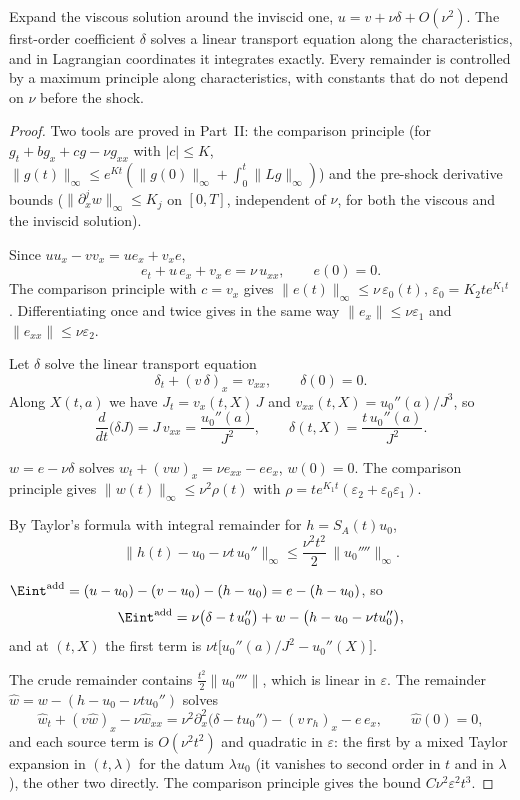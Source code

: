 \begin{proofidea}
Expand the viscous solution around the inviscid one, $u=v+\nu\delta+O(\nu^2)$. The first-order coefficient $\delta$ solves a linear transport equation along the characteristics, and in Lagrangian coordinates it integrates exactly. Every remainder is controlled by a maximum principle along characteristics, with constants that do not depend on $\nu$ before the shock.
\end{proofidea}

\begin{proof}
Two tools are proved in Part~II: the comparison principle  (for $g_t+bg_x+cg-\nu g_{xx}$ with $|c|\le K$, $\|g(t)\|_\infty\le e^{Kt}(\|g(0)\|_\infty+\int_0^t\|Lg\|_\infty)$) and the pre-shock derivative bounds  ($\|\partial_x^jw\|_\infty\le K_j$ on $[0,T]$, independent of $\nu$, for both the viscous and the inviscid solution).

Since $uu_x-vv_x=ue_x+v_xe$,
\[
e_t+u\,e_x+v_x\,e=\nu\,u_{xx},\qquad e(0)=0 .
\]
The comparison principle with $c=v_x$ gives $\|e(t)\|_\infty\le\nu\,\varepsilon_0(t)$, $\varepsilon_0=K_2te^{K_1t}$. Differentiating once and twice gives in the same way $\|e_x\|\le\nu\varepsilon_1$ and $\|e_{xx}\|\le\nu\varepsilon_2$.

Let $\delta$ solve the linear transport equation
\[
\delta_t+(v\,\delta)_x=v_{xx},\qquad \delta(0)=0 .
\]
Along $X(t,a)$ we have $J_t=v_x(t,X)\,J$ and $v_{xx}(t,X)=u_0''(a)/J^3$, so
\[
\frac{d}{dt}\big(\delta J\big)=J\,v_{xx}=\frac{u_0''(a)}{J^2},\qquad
\delta(t,X)=\frac{t\,u_0''(a)}{J^2}.
\]

$w=e-\nu\delta$ solves $w_t+(vw)_x=\nu e_{xx}-ee_x$, $w(0)=0$. The comparison principle gives $\|w(t)\|_\infty\le\nu^2\rho(t)$ with $\rho=te^{K_1t}(\varepsilon_2+\varepsilon_0\varepsilon_1)$.

By Taylor's formula with integral remainder for $h=S_A(t)u_0$,
\[
\big\|h(t)-u_0-\nu t\,u_0''\big\|_\infty\le\frac{\nu^2t^2}{2}\,\|u_0''''\|_\infty .
\]

$\Eint^{\mathrm{add}}=(u-u_0)-(v-u_0)-(h-u_0)=e-(h-u_0)$, so
\[
\Eint^{\mathrm{add}}=\nu\big(\delta-t\,u_0''\big)+w-\big(h-u_0-\nu tu_0''\big),
\]
and at $(t,X)$ the first term is $\nu t\big[u_0''(a)/J^2-u_0''(X)\big]$.

The crude remainder contains $\tfrac{t^2}2\|u_0''''\|$, which is linear in $\varepsilon$. The remainder $\hat w=w-(h-u_0-\nu tu_0'')$ solves
\[
\hat w_t+(v\hat w)_x-\nu\hat w_{xx}=\nu^2\partial_x^2\big(\delta-tu_0''\big)-(v\,r_h)_x-e\,e_x,\qquad \hat w(0)=0,
\]
and each source term is $O(\nu^2t^2)$ and quadratic in $\varepsilon$: the first by a mixed Taylor expansion in $(t,\lambda)$ for the datum $\lambda u_0$ (it vanishes to second order in $t$ and in $\lambda$), the other two directly. The comparison principle gives the bound $C\nu^2\varepsilon^2t^3$.

\end{proof}
